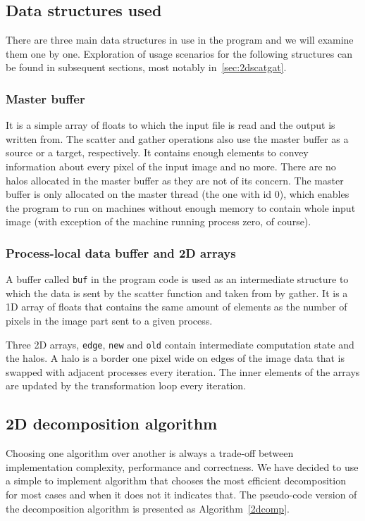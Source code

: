 \documentclass[11pt,a4paper]{article}
\begin{document}
\subsection{Data structures used}
There are three main data structures in use in the program and we will examine them one by one.
Exploration of usage scenarios for the following structures can be found in subsequent sections, most notably in~\ref{sec:2dscatgat}.

\subsubsection{Master buffer}
It is a simple array of floats to which the input file is read and the output is written from. 
The scatter and gather operations also use the master buffer as a source or a target, respectively. 
It contains enough elements to convey information about every pixel of the input image and no more. 
There are no halos allocated in the master buffer as they are not of its concern. 
The master buffer is only allocated on the master thread (the one with id 0), which enables the program to run on machines without enough memory to contain whole input image (with exception of the machine running process zero, of course).

\subsubsection{Process-local data buffer and 2D arrays}
A buffer called \texttt{buf} in the program code is used as an intermediate structure to which the data is sent by the scatter function and taken from by gather. 
It is a 1D array of floats that contains the same amount of elements as the number of pixels in the image part sent to a given process. 

Three 2D arrays, \texttt{edge}, \texttt{new} and \texttt{old} contain intermediate computation state and the halos. 
A halo is a border one pixel wide on edges of the image data that is swapped with adjacent processes every iteration.
The inner elements of the arrays are updated by the transformation loop every iteration.

\subsection{2D decomposition algorithm}
\label{sec:2ddec}
Choosing one algorithm over another is always a trade-off between implementation complexity, performance and correctness. We have decided to use a simple to implement algorithm that chooses the most efficient decomposition for most cases and when it does not it indicates that. The pseudo-code version of the decomposition algorithm is presented as Algorithm~\ref{2dcomp}.
\end{document}
